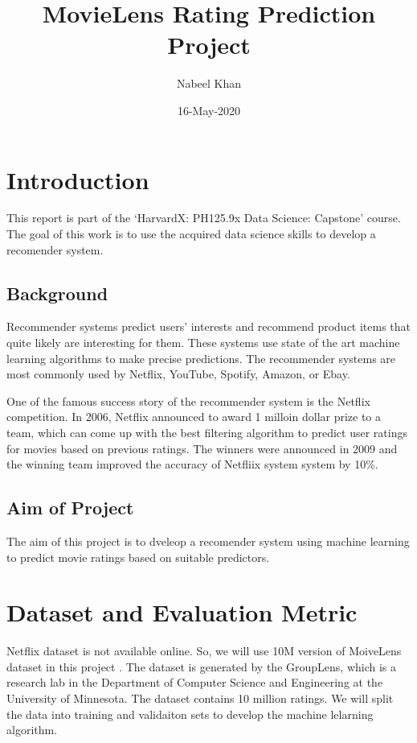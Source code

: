 \documentclass[]{article}
\title{MovieLens Rating Prediction Project}
\author{Nabeel Khan}
\date{16-May-2020}
\begin{document}
\maketitle

{
\setcounter{tocdepth}{2}
\tableofcontents
}
\section{Introduction} 
\label{sec:introduction}

This report is part of the `HarvardX: PH125.9x Data Science: Capstone'
course. The goal of this work is to use the acquired data science skills
to develop a recomender system.

\subsection{Background} 
\label{sec:background}

Recommender systems predict users' interests and recommend product items
that quite likely are interesting for them\cite{rsystems,systems1}.
These systems use state of the art machine learning algorithms to make
precise predictions. The recommender systems are most commonly used by
Netflix, YouTube, Spotify, Amazon, or Ebay.

One of the famous success story of the recommender system is the Netflix
competition\cite{nfc}. In 2006, Netflix announced to award 1 milloin
dollar prize to a team, which can come up with the best filtering
algorithm to predict user ratings for movies based on previous ratings.
The winners were announced in 2009 and the winning team improved the
accuracy of Netfliix system system by 10\%.

\subsection{Aim of Project} 
\label{sec:projectaim}

The aim of this project is to dveleop a recomender system using machine
learning to predict movie ratings based on suitable predictors.

\section{Dataset and Evaluation Metric} 
\label{sec:datasetmetric}

Netflix dataset is not available online. So, we will use 10M version of
MoiveLens dataset in this project \cite{dataset}. The dataset is
generated by the GroupLens, which is a research lab in the Department of
Computer Science and Engineering at the University of Minnesota. The
dataset contains 10 million ratings. We will split the data into
training and validaiton sets to develop the machine lelarning algorithm.
\end{document}
